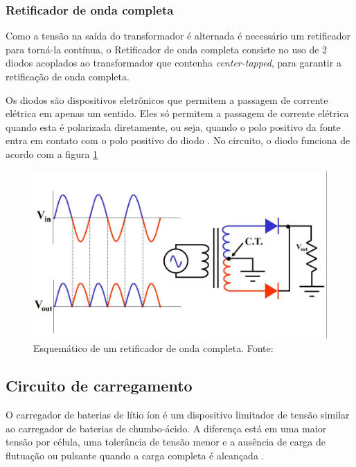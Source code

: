 \subsubsection{Retificador de onda completa}

\par Como a tensão na saída do transformador é alternada é necessário um retificador para torná-la contínua, o Retificador de onda completa consiste no uso de 2 diodos acoplados ao transformador que contenha \textit{center-tapped}, para garantir a retificação de onda completa. 

\par Os diodos são dispositivos eletrônicos que permitem a passagem de corrente elétrica em apenas um sentido. Eles só permitem a passagem de corrente elétrica quando esta é polarizada diretamente, ou seja, quando o polo positivo da fonte entra em contato com o polo positivo do diodo \cite{retificador}. No circuito, o diodo funciona de acordo com a figura \ref{fig:retificador}

\begin{figure}[H]
	\centering
		\includegraphics[keepaspectratio=true,scale=0.5]{figuras/retificador_completo.JPG}
	\caption{Esquemático de um retificador de onda completa. Fonte: \cite{retificador}}
	\label{fig:retificador}
\end{figure}

\subsection{Circuito de carregamento}
\label{sec:carregador}

\par O carregador de baterias de lítio íon é um dispositivo limitador de tensão similar ao carregador de baterias de chumbo-ácido. A diferença está em uma maior tensão por célula, uma tolerância de tensão menor e a ausência de carga de flutuação ou pulsante quando a carga completa é alcançada \cite{bateria_litio}.

